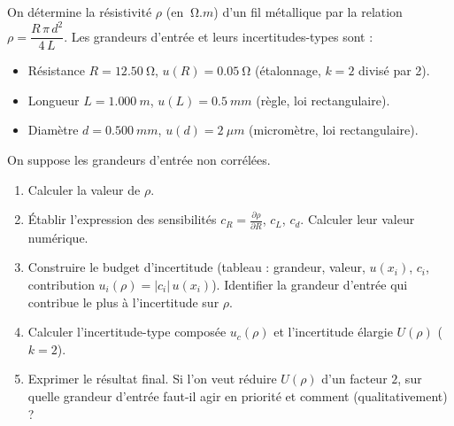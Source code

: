 \documentclass[11pt]{article}
\begin{document}
\begin{exercice}
On détermine la résistivité $\rho$ (en $\SI{}{\ohm.m}$) d'un fil métallique par la relation $\rho = \dfrac{R\,\pi\,d^2}{4\,L}$.
Les grandeurs d'entrée et leurs incertitudes-types sont :
\begin{itemize}
    \item Résistance $R = \SI{12,50}{\ohm}$, $u(R) = \SI{0,05}{\ohm}$ (étalonnage, $k=2$ divisé par 2).
    \item Longueur $L = \SI{1,000}{m}$, $u(L) = \SI{0,5}{mm}$ (règle, loi rectangulaire).
    \item Diamètre $d = \SI{0,500}{mm}$, $u(d) = \SI{2}{\mu m}$ (micromètre, loi rectangulaire).
\end{itemize}
On suppose les grandeurs d'entrée non corrélées.
\begin{enumerate}
    \item Calculer la valeur de $\rho$.
    \item Établir l'expression des sensibilités $c_R = \frac{\partial \rho}{\partial R}$, $c_L$, $c_d$. Calculer leur valeur numérique.
    \item Construire le budget d'incertitude (tableau : grandeur, valeur, $u(x_i)$, $c_i$, contribution $u_i(\rho) = |c_i|\,u(x_i)$). Identifier la grandeur d'entrée qui contribue le plus à l'incertitude sur $\rho$.
    \item Calculer l'incertitude-type composée $u_c(\rho)$ et l'incertitude élargie $U(\rho)$ ($k=2$).
    \item Exprimer le résultat final. Si l'on veut réduire $U(\rho)$ d'un facteur $2$, sur quelle grandeur d'entrée faut-il agir en priorité et comment (qualitativement) ?
\end{enumerate}
\end{exercice}
\end{document}
